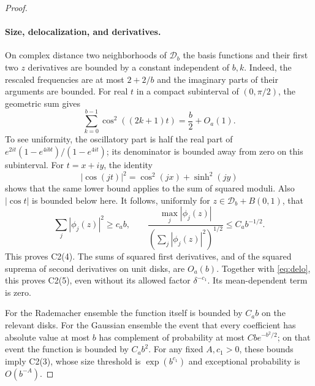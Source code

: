 \documentclass[11pt]{article}
\begin{document}
\begin{proof}
\paragraph{Size, delocalization, and derivatives.}
On complex distance two neighborhoods of $\mathcal D_b$ the basis
functions and their first two $z$ derivatives are bounded by a constant
independent of $b,k$. Indeed, the rescaled frequencies are at most
$2+2/b$ and the imaginary parts of their arguments are bounded.
For real $t$ in a compact subinterval of $(0,\pi/2)$, the geometric sum gives
\begin{equation}\label{eq:variance0}
 \sum_{k=0}^{b-1}\cos^2((2k+1)t)=\frac b2+O_a(1).
\end{equation}
To see uniformity, the oscillatory part is half the real part of
$e^{2it}(1-e^{4ibt})/(1-e^{4it})$; its denominator is bounded away
from zero on this subinterval.
For $t=x+iy$, the identity
\[
 |\cos(jt)|^2=\cos^2(jx)+\sinh^2(jy)
\]
shows that the same lower bound applies to the sum of squared moduli.
Also $|\cos t|$ is bounded below here. It follows, uniformly for
$z\in\mathcal D_b+B(0,1)$, that
\begin{equation}\label{eq:delo}
 \sum_j|\phi_j(z)|^2\ge c_a b,\qquad
 \frac{\max_j|\phi_j(z)|}{(\sum_j|\phi_j(z)|^2)^{1/2}}
 \le C_a b^{-1/2}.
\end{equation}
This proves C2(4). The sums of squared first derivatives, and of the
squared suprema of second derivatives on unit disks, are $O_a(b)$.
Together with \eqref{eq:delo}, this proves C2(5), even without its
allowed factor $\delta^{-c_1}$. Its mean-dependent term is zero.

For the Rademacher ensemble the function itself is bounded by $C_a b$
on the relevant disks. For the Gaussian ensemble the event that every
coefficient has absolute value at most $b$ has complement of probability
at most $C b e^{-b^2/2}$; on that event the function is bounded by
$C_a b^2$. For any fixed $A,c_1>0$, these bounds imply C2(3), whose
size threshold is $\exp(b^{c_1})$ and exceptional probability is
$O(b^{-A})$.


\end{proof}
\end{document}
